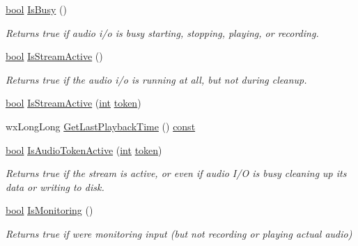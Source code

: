 \begin{DoxyCompactItemize}
\hyperlink{mac_2config_2i386_2lib-src_2libsoxr_2soxr-config_8h_abb452686968e48b67397da5f97445f5b}{bool} \hyperlink{class_audio_i_o_a10f4e839ded338c433a4cd46a6ba41b1}{Is\+Busy} ()
\begin{DoxyCompactList}\small\item\em Returns true if audio i/o is busy starting, stopping, playing, or recording. \end{DoxyCompactList}\item 
\hyperlink{mac_2config_2i386_2lib-src_2libsoxr_2soxr-config_8h_abb452686968e48b67397da5f97445f5b}{bool} \hyperlink{class_audio_i_o_a07490d6ae881910c5ea13cdf011835f3}{Is\+Stream\+Active} ()
\begin{DoxyCompactList}\small\item\em Returns true if the audio i/o is running at all, but not during cleanup. \end{DoxyCompactList}\item 
\hyperlink{mac_2config_2i386_2lib-src_2libsoxr_2soxr-config_8h_abb452686968e48b67397da5f97445f5b}{bool} \hyperlink{class_audio_i_o_aab4123922c22aac622db1512d01c6c18}{Is\+Stream\+Active} (\hyperlink{xmltok_8h_a5a0d4a5641ce434f1d23533f2b2e6653}{int} \hyperlink{seqread_8c_a472e2484c39e6e56a4c486a7d779841d}{token})
\item 
wx\+Long\+Long \hyperlink{class_audio_i_o_a313e20357b22f7adbbdd274ef1e2e84e}{Get\+Last\+Playback\+Time} () \hyperlink{getopt1_8c_a2c212835823e3c54a8ab6d95c652660e}{const} 
\item 
\hyperlink{mac_2config_2i386_2lib-src_2libsoxr_2soxr-config_8h_abb452686968e48b67397da5f97445f5b}{bool} \hyperlink{class_audio_i_o_ae38ba2eafdaf5a1579366d788fd669d9}{Is\+Audio\+Token\+Active} (\hyperlink{xmltok_8h_a5a0d4a5641ce434f1d23533f2b2e6653}{int} \hyperlink{seqread_8c_a472e2484c39e6e56a4c486a7d779841d}{token})
\begin{DoxyCompactList}\small\item\em Returns true if the stream is active, or even if audio I/O is busy cleaning up its data or writing to disk. \end{DoxyCompactList}\item 
\hyperlink{mac_2config_2i386_2lib-src_2libsoxr_2soxr-config_8h_abb452686968e48b67397da5f97445f5b}{bool} \hyperlink{class_audio_i_o_a81838290ddb586dc13726abf901b8260}{Is\+Monitoring} ()
\begin{DoxyCompactList}\small\item\em Returns true if we\textquotesingle{}re monitoring input (but not recording or playing actual audio) \end{DoxyCompactList}\item 

\end{DoxyCompactItemize}
